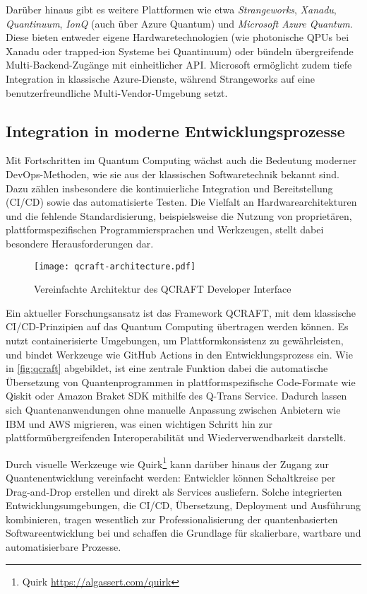 Darüber hinaus gibt es weitere Plattformen wie etwa \textit{Strangeworks}, \textit{Xanadu}, \textit{Quantinuum}, \textit{IonQ} (auch über Azure Quantum) und \textit{Microsoft Azure Quantum}. Diese bieten entweder eigene Hardwaretechnologien (wie photonische QPUs bei Xanadu oder trapped-ion Systeme bei Quantinuum) oder bündeln übergreifende Multi-Backend-Zugänge mit einheitlicher API. Microsoft ermöglicht zudem tiefe Integration in klassische Azure-Dienste, während Strangeworks auf eine benutzerfreundliche Multi-Vendor-Umgebung setzt.

\subsection{Integration in moderne Entwicklungsprozesse}
\label{sec:integration-devops}

Mit Fortschritten im Quantum Computing wächst auch die Bedeutung moderner DevOps-Methoden, wie sie aus der klassischen Softwaretechnik bekannt sind. Dazu zählen insbesondere die kontinuierliche Integration und Bereitstellung (CI/CD) sowie das automatisierte Testen. Die Vielfalt an Hardwarearchitekturen und die fehlende Standardisierung, beispielsweise die Nutzung von proprietären, plattformspezifischen Programmiersprachen und Werkzeugen, stellt dabei besondere Herausforderungen dar.

\begin{figure}[ht!]
  \centering
  \texttt{[image: qcraft-architecture.pdf]}
  \caption{Vereinfachte Architektur des QCRAFT Developer Interface \autocite{romero-alvarez_qcraft_2025}}
  \label{fig:qcraft}
\end{figure}

Ein aktueller Forschungsansatz ist das Framework QCRAFT, mit dem klassische CI/CD-Prinzipien auf das Quantum Computing übertragen werden können. Es nutzt containerisierte Umgebungen, um Plattformkonsistenz zu gewährleisten, und bindet Werkzeuge wie GitHub Actions in den Entwicklungsprozess ein. Wie in \autoref{fig:qcraft} abgebildet, ist eine zentrale Funktion dabei die automatische Übersetzung von Quantenprogrammen in plattformspezifische Code-Formate wie Qiskit oder Amazon Braket SDK mithilfe des Q-Trans Service. Dadurch lassen sich Quantenanwendungen ohne manuelle Anpassung zwischen Anbietern wie IBM und AWS migrieren, was einen wichtigen Schritt hin zur plattformübergreifenden Interoperabilität und Wiederverwendbarkeit darstellt.

Durch visuelle Werkzeuge wie Quirk\footnote{Quirk \url{https://algassert.com/quirk}} kann darüber hinaus der Zugang zur Quantenentwicklung vereinfacht werden: Entwickler können Schaltkreise per Drag-and-Drop erstellen und direkt als Services ausliefern. Solche integrierten Entwicklungsumgebungen, die CI/CD, Übersetzung, Deployment und Ausführung kombinieren, tragen wesentlich zur Professionalisierung der quantenbasierten Softwareentwicklung bei und schaffen die Grundlage für skalierbare, wartbare und automatisierbare Prozesse. \autocite{romero-alvarez_qcraft_2025}

